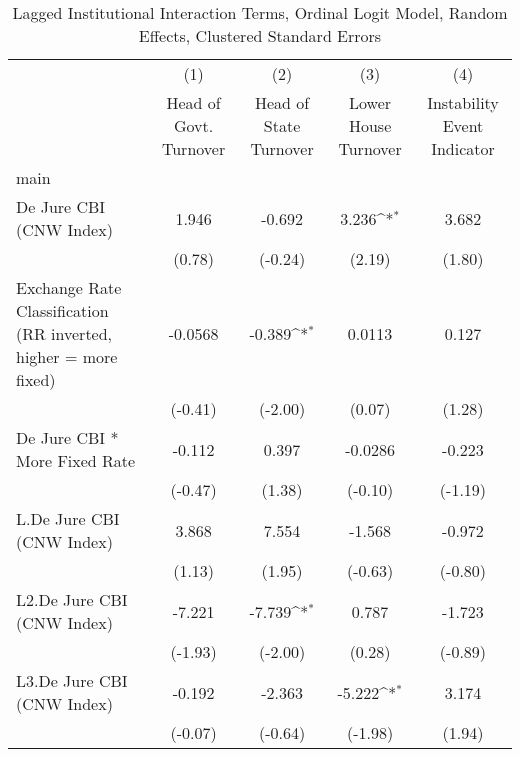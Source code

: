 {
\def\sym#1{\ifmmode^{#1}\else\(^{#1}\)\fi}
\begin{longtable}{l*{4}{c}}
\caption{Lagged Institutional Interaction Terms, Ordinal Logit Model, Random Effects, Clustered Standard Errors \label{intlagordLogLogDJ}}\\
\hline\hline\endfirsthead\hline\endhead\hline\endfoot\endlastfoot
                &\multicolumn{1}{c}{(1)}&\multicolumn{1}{c}{(2)}&\multicolumn{1}{c}{(3)}&\multicolumn{1}{c}{(4)}\\
                &\multicolumn{1}{c}{Head of Govt. Turnover}&\multicolumn{1}{c}{Head of State Turnover}&\multicolumn{1}{c}{Lower House Turnover}&\multicolumn{1}{c}{Instability Event Indicator}\\
\hline
main            &                  &                  &                  &                  \\
De Jure CBI (CNW Index)&    1.946         &   -0.692         &    3.236\sym{*}  &    3.682         \\
                &   (0.78)         &  (-0.24)         &   (2.19)         &   (1.80)         \\
[1em]
Exchange Rate Classification (RR inverted, higher = more fixed)&  -0.0568         &   -0.389\sym{*}  &   0.0113         &    0.127         \\
                &  (-0.41)         &  (-2.00)         &   (0.07)         &   (1.28)         \\
[1em]
De Jure CBI * More Fixed Rate&   -0.112         &    0.397         &  -0.0286         &   -0.223         \\
                &  (-0.47)         &   (1.38)         &  (-0.10)         &  (-1.19)         \\
[1em]
L.De Jure CBI (CNW Index)&    3.868         &    7.554         &   -1.568         &   -0.972         \\
                &   (1.13)         &   (1.95)         &  (-0.63)         &  (-0.80)         \\
[1em]
L2.De Jure CBI (CNW Index)&   -7.221         &   -7.739\sym{*}  &    0.787         &   -1.723         \\
                &  (-1.93)         &  (-2.00)         &   (0.28)         &  (-0.89)         \\
[1em]
L3.De Jure CBI (CNW Index)&   -0.192         &   -2.363         &   -5.222\sym{*}  &    3.174         \\
                &  (-0.07)         &  (-0.64)         &  (-1.98)         &   (1.94)         \\

\end{longtable}}
